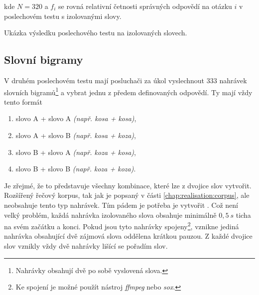 \noindent kde $N=320$ a $f_i$ se rovná relativní četnosti správných odpovědí na otázku $i$ v poslechovém testu s izolovanými slovy.

\begin{table}[htpb]
  \centering
  \def\arraystretch{1.5}
  \caption{Ukázka výsledku poslechového testu na izolovaných slovech.}
  \label{tab:realisation:listening:isolated}
\end{table}

\subsection{Slovní bigramy}
\label{chap:realisation:listening:bigrams}

V druhém poslechovém testu mají posluchači za úkol vyslechnout $333$ nahrávek slovních bigramů\footnote{Nahrávky obsahují dvě po sobě vyslovená slova.} a vybrat jednu z předem definovaných odpovědí. Ty mají vždy tento formát

\begin{enumerate}[label=\alph*)]
  \item slovo A + slovo A \textit{(např. kosa + kosa)},
  \item slovo A + slovo B \textit{(např. kosa + koza)},
  \item slovo B + slovo A \textit{(např. koza + kosa)},
  \item slovo B + slovo B \textit{(např. koza + koza)}.
\end{enumerate}

\noindent Je zřejmé, že to představuje všechny kombinace, které lze z dvojice slov vytvořit. Rozšířený řečový korpus, tak jak je popsaný v části \ref{chap:realisation:corpus}, ale neobsahuje tento typ nahrávek. Tím pádem je potřeba je vytvořit . Což není velký problém, každá nahrávka izolovaného slova obsahuje minimálně $0,5\ s$ ticha na svém začátku a konci. Pokud jsou tyto nahrávky spojeny\footnote{Ke spojení je možné použít nástroj \textit{ffmpeg} nebo \textit{sox}.}, vznikne jediná nahrávka obsahující dvě zájmová slova oddělena krátkou pauzou. Z každé dvojice slov vznikly vždy dvě nahrávky lišící se pořadím slov.

